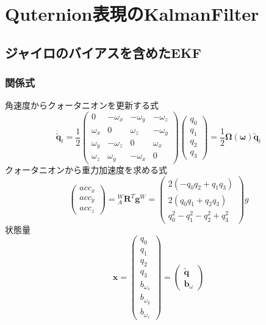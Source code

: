 \section{Quternion表現のKalmanFilter} \label{sec:quaternion_kalman_filter}

\subsection{ジャイロのバイアスを含めたEKF}
\subsubsection{関係式}
角速度からクォータニオンを更新する式
\begin{equation}
  \dot{\tilde{\boldsymbol{q}}}_{t} =
  \frac{1}{2}
  \begin{pmatrix}
    0        & -\omega_x & -\omega_y & -\omega_z\\
    \omega_x &         0 &  \omega_z & -\omega_y\\
    \omega_y & -\omega_z &         0 &  \omega_x\\
    \omega_z &  \omega_y & -\omega_x &         0
  \end{pmatrix}
  \begin{pmatrix}
    q_0\\
    q_1\\
    q_2\\
    q_3
  \end{pmatrix} =
  \frac{1}{2}
  \boldsymbol{\Omega}(\boldsymbol{\omega})
  \tilde{\boldsymbol{q}}_{t}
\end{equation}
クォータニオンから重力加速度を求める式
\begin{equation}
  \begin{pmatrix}
    acc_x\\
    acc_y\\
    acc_z
  \end{pmatrix} =
  {}^{W}_{A}\boldsymbol{R}^{T} \boldsymbol{g}^{W}
  =
  \begin{pmatrix}
    2\left(- q_0 q_2 + q_1 q_3\right)\\
    2\left(q_0 q_1 + q_2 q_3\right)\\
    q_0^2-q_1^2-q_2^2+q_3^2
  \end{pmatrix}
  g
\end{equation}
状態量
\begin{equation}
  \boldsymbol{x} =
  \begin{pmatrix}
    q_0\\
    q_1\\
    q_2\\
    q_3\\
    b_{\omega_x}\\
    b_{\omega_y}\\
    b_{\omega_z}
  \end{pmatrix} =
  \begin{pmatrix}
    \tilde{\boldsymbol{q}}\\
    \boldsymbol{b}_{\omega}
  \end{pmatrix}
\end{equation}


